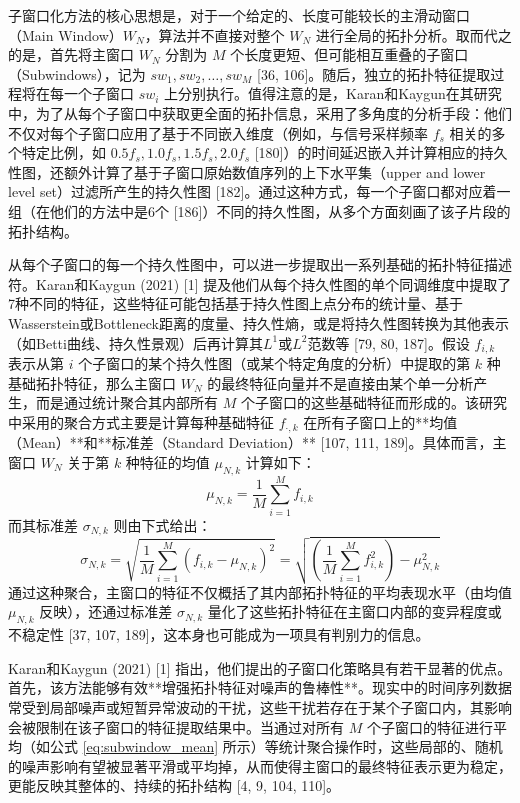         子窗口化方法的核心思想是，对于一个给定的、长度可能较长的主滑动窗口（Main Window）$W_N$，算法并不直接对整个 $W_N$ 进行全局的拓扑分析。取而代之的是，首先将主窗口 $W_N$ 分割为 $M$ 个长度更短、但可能相互重叠的子窗口（Subwindows），记为 $sw_1, sw_2, \dots, sw_M$ [36, 106]。随后，独立的拓扑特征提取过程将在每一个子窗口 $sw_i$ 上分别执行。值得注意的是，Karan和Kaygun在其研究中，为了从每个子窗口中获取更全面的拓扑信息，采用了多角度的分析手段：他们不仅对每个子窗口应用了基于不同嵌入维度（例如，与信号采样频率 $f_s$ 相关的多个特定比例，如 $0.5f_s, 1.0f_s, 1.5f_s, 2.0f_s$ [180]）的时间延迟嵌入并计算相应的持久性图，还额外计算了基于子窗口原始数值序列的上下水平集（upper and lower level set）过滤所产生的持久性图 [182]。通过这种方式，每一个子窗口都对应着一组（在他们的方法中是6个 [186]）不同的持久性图，从多个方面刻画了该子片段的拓扑结构。
        
        从每个子窗口的每一个持久性图中，可以进一步提取出一系列基础的拓扑特征描述符。Karan和Kaygun (2021) [1] 提及他们从每个持久性图的单个同调维度中提取了7种不同的特征，这些特征可能包括基于持久性图上点分布的统计量、基于Wasserstein或Bottleneck距离的度量、持久性熵，或是将持久性图转换为其他表示（如Betti曲线、持久性景观）后再计算其$L^1$或$L^2$范数等 [79, 80, 187]。假设 $f_{i,k}$ 表示从第 $i$ 个子窗口的某个持久性图（或某个特定角度的分析）中提取的第 $k$ 种基础拓扑特征，那么主窗口 $W_N$ 的最终特征向量并不是直接由某个单一分析产生，而是通过统计聚合其内部所有 $M$ 个子窗口的这些基础特征而形成的。该研究中采用的聚合方式主要是计算每种基础特征 $f_{\cdot,k}$ 在所有子窗口上的**均值（Mean）**和**标准差（Standard Deviation）** [107, 111, 189]。具体而言，主窗口 $W_N$ 关于第 $k$ 种特征的均值 $\mu_{N,k}$ 计算如下：
        \begin{equation}
            \mu_{N,k} = \frac{1}{M} \sum_{i=1}^{M} f_{i,k}
            \label{eq:subwindow_mean}
        \end{equation}
        而其标准差 $\sigma_{N,k}$ 则由下式给出：
        \begin{equation}
            \sigma_{N,k} = \sqrt{\frac{1}{M}\sum_{i=1}^{M}(f_{i,k} - \mu_{N,k})^2} = \sqrt{\left(\frac{1}{M}\sum_{i=1}^{M}f_{i,k}^2\right) - \mu_{N,k}^2}
            \label{eq:subwindow_std}
        \end{equation}
        通过这种聚合，主窗口的特征不仅概括了其内部拓扑特征的平均表现水平（由均值 $\mu_{N,k}$ 反映），还通过标准差 $\sigma_{N,k}$ 量化了这些拓扑特征在主窗口内部的变异程度或不稳定性 [37, 107, 189]，这本身也可能成为一项具有判别力的信息。
        
        Karan和Kaygun (2021) [1] 指出，他们提出的子窗口化策略具有若干显著的优点。首先，该方法能够有效**增强拓扑特征对噪声的鲁棒性**。现实中的时间序列数据常受到局部噪声或短暂异常波动的干扰，这些干扰若存在于某个子窗口内，其影响会被限制在该子窗口的特征提取结果中。当通过对所有 $M$ 个子窗口的特征进行平均（如公式 \ref{eq:subwindow_mean} 所示）等统计聚合操作时，这些局部的、随机的噪声影响有望被显著平滑或平均掉，从而使得主窗口的最终特征表示更为稳定，更能反映其整体的、持续的拓扑结构 [4, 9, 104, 110]。
        
